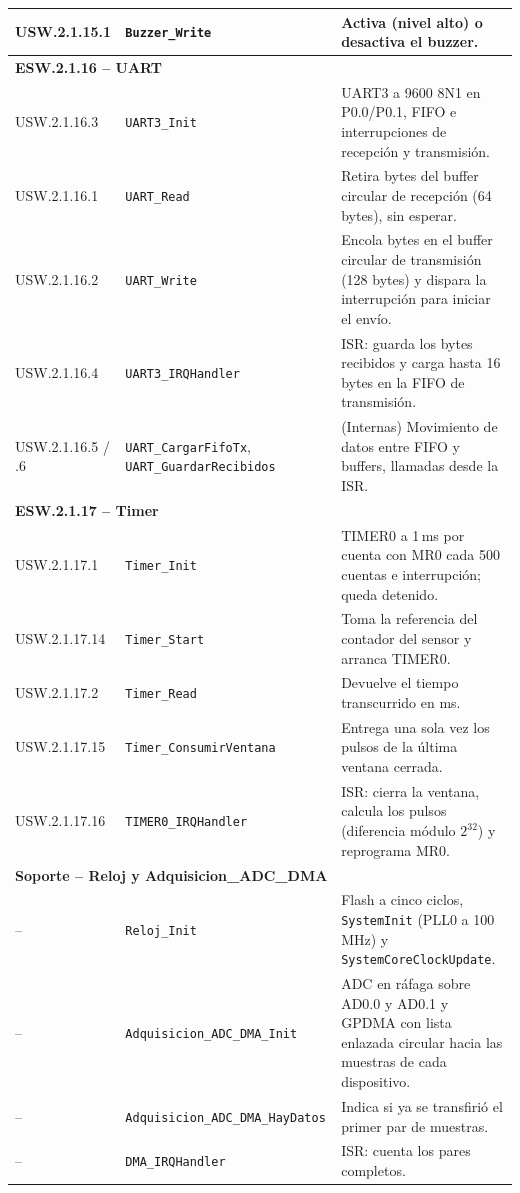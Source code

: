 \begin{longtable}{|p{2.4cm}|p{4.6cm}|p{7.6cm}|}
USW.2.1.15.1 & \texttt{Buzzer\_Write} & Activa (nivel alto) o desactiva el buzzer. \\ \hline
\multicolumn{3}{|l|}{\textbf{ESW.2.1.16 -- UART}} \\ \hline
USW.2.1.16.3 & \texttt{UART3\_Init} & UART3 a 9600 8N1 en P0.0/P0.1, FIFO e
interrupciones de recepción y transmisión. \\ \hline
USW.2.1.16.1 & \texttt{UART\_Read} & Retira bytes del buffer circular de recepción (64
bytes), sin esperar. \\ \hline
USW.2.1.16.2 & \texttt{UART\_Write} & Encola bytes en el buffer circular de transmisión
(128 bytes) y dispara la interrupción para iniciar el envío. \\ \hline
USW.2.1.16.4 & \texttt{UART3\_IRQHandler} & ISR: guarda los bytes recibidos y carga hasta
16 bytes en la FIFO de transmisión. \\ \hline
USW.2.1.16.5 / .6 & \texttt{UART\_CargarFifoTx}, \texttt{UART\_GuardarRecibidos} &
(Internas) Movimiento de datos entre FIFO y buffers, llamadas desde la ISR. \\ \hline
\multicolumn{3}{|l|}{\textbf{ESW.2.1.17 -- Timer}} \\ \hline
USW.2.1.17.1 & \texttt{Timer\_Init} & TIMER0 a 1\,ms por cuenta con MR0 cada 500 cuentas
e interrupción; queda detenido. \\ \hline
USW.2.1.17.14 & \texttt{Timer\_Start} & Toma la referencia del contador del sensor y
arranca TIMER0. \\ \hline
USW.2.1.17.2 & \texttt{Timer\_Read} & Devuelve el tiempo transcurrido en ms. \\ \hline
USW.2.1.17.15 & \texttt{Timer\_ConsumirVentana} & Entrega una sola vez los pulsos de la
última ventana cerrada. \\ \hline
USW.2.1.17.16 & \texttt{TIMER0\_IRQHandler} & ISR: cierra la ventana, calcula los pulsos
(diferencia módulo $2^{32}$) y reprograma MR0. \\ \hline
\multicolumn{3}{|l|}{\textbf{Soporte -- Reloj y Adquisicion\_ADC\_DMA}} \\ \hline
-- & \texttt{Reloj\_Init} & Flash a cinco ciclos, \texttt{SystemInit} (PLL0 a 100\,MHz) y
\texttt{SystemCoreClockUpdate}. \\ \hline
-- & \texttt{Adquisicion\_ADC\_DMA\_\-Init} & ADC en ráfaga sobre AD0.0 y AD0.1 y GPDMA
con lista enlazada circular hacia las muestras de cada dispositivo. \\ \hline
-- & \texttt{Adquisicion\_ADC\_DMA\_\-HayDatos} & Indica si ya se transfirió el primer par
de muestras. \\ \hline
-- & \texttt{DMA\_IRQHandler} & ISR: cuenta los pares completos. \\ \hline
\end{longtable}

